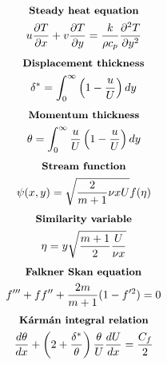 \documentclass[10pt, a4paper]{article}
\newcommand{\derivative}[2]{\frac{\partial #1}{\partial #2}}
\begin{document}
\begin{multicols*}{2}
    \begin{gather*}
        \textbf{\small Steady heat equation} \\
        u\derivative{ T}{x} + v \derivative{ T}{y} =
        \frac{k}{\rho c_p} \derivative{^2 T}{y^2}
    \end{gather*}
    \begin{gather*}
        \textbf{\small Displacement thickness} \\
        \delta^* = \int_0^\infty\left( 1 - \frac{u}{U} \right)dy
    \end{gather*}
    \begin{gather*}
        \textbf{\small Momentum thickness} \\
        \theta = \int_0^\infty \frac{u}{U}\left( 1 - \frac{u}{U} \right)dy
    \end{gather*}
    \begin{gather*}
        \textbf{\small Stream function} \\
        \psi(x,y) = \sqrt{\frac{2}{m+1}\nu x U}f(\eta)
    \end{gather*}
    \begin{gather*}
        \textbf{\small Similarity variable} \\
        \eta = y \sqrt{\frac{m+1}{2}\frac{U}{\nu x}}
    \end{gather*}
    \begin{gather*}
        \textbf{\small Falkner Skan equation} \\
        f''' + ff'' + \frac{2m}{m+1}(1-f'^2)=0
    \end{gather*}
    \begin{gather*}
        \textbf{\small Kármán integral relation} \\
        \frac{d\theta}{dx} + \left( 2 + \frac{\delta^*}{\theta} \right)\frac{\theta}{U}\frac{dU}{dx} =
        \frac{C_f}{2}
    \end{gather*}
\end{multicols*}
\end{document}
